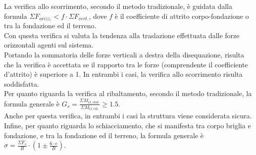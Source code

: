 La verifica allo scorrimento, secondo il metodo tradizionale, è guidata dalla formula $\Sigma F_{orizz.}<f\cdot\Sigma F_{vert.}$, dove $f$ è il coefficiente di attrito corpo-fondazione o tra la fondazione ed il terreno.\\
Con questa verifica si valuta la tendenza alla traslazione effettuata dalle forze orizzontali agenti sul sistema.\\
Portando la sommatoria delle forze verticali a destra della disequazione, risulta che la verifica è accettata se il rapporto tra le forze (comprendente il coefficiente d'attrito) è superiore a 1. In entrambi i casi, la verifica allo scorrimento risulta soddisfatta.\\
Per quanto riguarda la verifica al ribaltamento, secondo il metodo tradizionale, la formula generale è $G_s = \frac{\Sigma M_{O,stab.}}{\Sigma M_{O,rib.}} \ge 1.5$.\\
Anche per questa verifica, in entrambi i casi la struttura viene considerata sicura.\\
Infine, per quanto riguarda lo schiacciamento, che si manifesta tra corpo briglia e fondazione, e tra la fondazione ed il terreno, la formula generale è $\sigma= \frac{\Sigma F_v}{B} \cdot \left(1 \pm \frac{6 \cdot e}{B}\right)$.